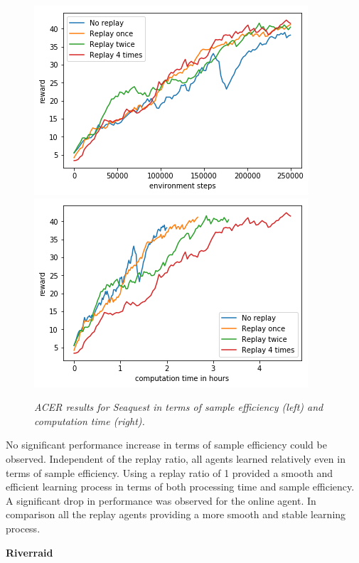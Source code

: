 \begin{figure}[h]
\includegraphics[scale=0.55]{bilder/seaquestbyonline.png}
\includegraphics[scale=0.55]{bilder/seaquestbytime.png}
\caption{\textit{ACER results for Seaquest in terms of sample efficiency (left) and computation time (right).}}
\label{seafig}
\end{figure}


No significant performance increase in terms of sample efficiency could be observed. Independent of the replay ratio, all agents learned relatively even in terms of sample efficiency.
Using a replay ratio of 1 provided a smooth and efficient learning process in terms of both processing time and sample efficiency. \linebreak A significant drop in performance was observed for the online agent. In comparison all the replay agents providing a more smooth and stable learning process.
\pagebreak

\begin{center}
\textbf{Riverraid}
\end{center} 

